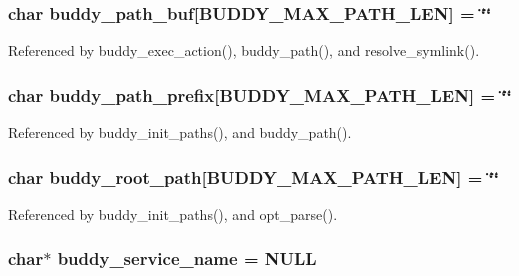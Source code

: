 \subsubsection[{buddy\_\-path\_\-buf}]{\setlength{\rightskip}{0pt plus 5cm}char {\bf buddy\_\-path\_\-buf}[BUDDY\_\-MAX\_\-PATH\_\-LEN] = \char`\"{}\char`\"{}\hspace{0.3cm}{\ttfamily  [static]}}\label{buddy_8c_a1eb224a393d00fd9a07b3a6c171e41bb}


Referenced by buddy\_\-exec\_\-action(), buddy\_\-path(), and resolve\_\-symlink().

\subsubsection[{buddy\_\-path\_\-prefix}]{\setlength{\rightskip}{0pt plus 5cm}char {\bf buddy\_\-path\_\-prefix}[BUDDY\_\-MAX\_\-PATH\_\-LEN] = \char`\"{}\char`\"{}\hspace{0.3cm}{\ttfamily  [static]}}\label{buddy_8c_aab6fb913e9f0fd28fb410b3b877aafae}


Referenced by buddy\_\-init\_\-paths(), and buddy\_\-path().

\subsubsection[{buddy\_\-root\_\-path}]{\setlength{\rightskip}{0pt plus 5cm}char {\bf buddy\_\-root\_\-path}[BUDDY\_\-MAX\_\-PATH\_\-LEN] = \char`\"{}\char`\"{}}\label{buddy_8c_a9715b970fd956abacde0cff8a337e0c4}


Referenced by buddy\_\-init\_\-paths(), and opt\_\-parse().

\subsubsection[{buddy\_\-service\_\-name}]{\setlength{\rightskip}{0pt plus 5cm}char$\ast$ {\bf buddy\_\-service\_\-name} = NULL}\label{buddy_8c_a46bdaaaea058028488e4a2fa4abcf80b}


